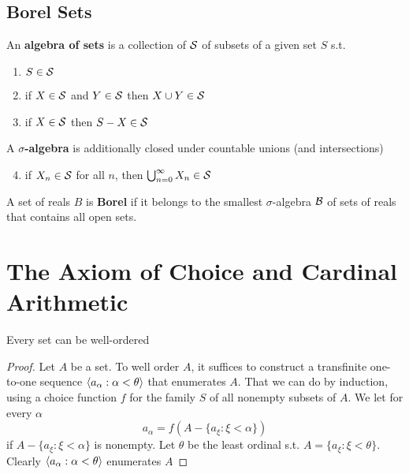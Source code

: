 \documentclass[11pt]{article}
\begin{document}
\subsection{Borel Sets}
\label{sec:orgd68882d}
\begin{definition}[]
An \textbf{algebra of sets} is a collection of \(\mathcal{S}\) of subsets of a given set \(S\)
s.t.
\begin{enumerate}
\item \(S\in\mathcal{S}\)
\item if \(X\in\mathcal{S}\) and \(Y\in\mathcal{S}\) then \(X\cup Y\in\mathcal{S}\)
\item if \(X\in\mathcal{S}\) then \(S-X\in\mathcal{S}\)
\end{enumerate}


A \textbf{\(\sigma\)-algebra} is additionally closed under countable unions (and
intersections)
\begin{enumerate}
\setcounter{enumi}{3}
\item if \(X_n\in\mathcal{S}\) for all \(n\), then \(\bigcup_{n=0}^\infty X_n\in\mathcal{S}\)
\end{enumerate}
\end{definition}

\begin{definition}[]
A set of reals \(B\) is \textbf{Borel} if it belongs to the smallest \(\sigma\)-algebra
\(\mathcal{B}\) of sets of reals that contains all open sets.
\end{definition}

\section{The Axiom of Choice and Cardinal Arithmetic}
\label{sec:org92d7dba}
\begin{theorem}
\label{thm5.1}
Every set can be well-ordered
\end{theorem}

\begin{proof}
Let \(A\) be a set. To well order \(A\), it suffices to construct a transfinite
one-to-one sequence \(\langle a_\alpha:\alpha<\theta\rangle\) that enumerates \(A\). That we can
do by induction, using a choice function \(f\) for the family \(S\) of all nonempty
subsets of \(A\). We let for every \(\alpha\) 
\begin{equation*}
a_\alpha=f(A-\{a_\xi:\xi<\alpha\})
\end{equation*}
if \(A-\{a_\xi:\xi<\alpha\}\) is nonempty. Let \(\theta\) be the least ordinal s.t.
\(A=\{a_\xi:\xi<\theta\}\). Clearly \(\langle a_\alpha:\alpha<\theta\rangle\) enumerates \(A\)
\end{proof}
\end{document}
